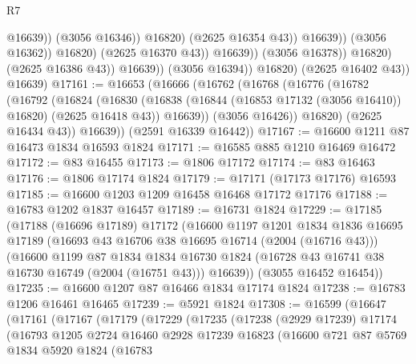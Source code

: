 \begin{lexlean}{R7}
\begin{coremodule}
                                              @16639))
                                          (@3056 @16346))
                                        @16820)
                                      (@2625 @16354 @43))
                                    @16639))
                                (@3056 @16362))
                              @16820)
                            (@2625 @16370 @43))
                          @16639))
                      (@3056 @16378))
                    @16820)
                  (@2625 @16386 @43))
                @16639))
            (@3056 @16394))
          @16820)
        (@2625 @16402 @43))
      @16639)
@17161 := @16653
    (@16666
      (@16762
        (@16768
          (@16776
            (@16782
              (@16792
                (@16824
                  (@16830
                    (@16838 (@16844 (@16853 @17132 (@3056 @16410)) @16820) (@2625 @16418 @43))
                    @16639))
                (@3056 @16426))
              @16820)
            (@2625 @16434 @43))
          @16639))
      (@2591 @16339 @16442))
@17167 := @16600 @1211 @87 @16473 @1834 @16593 @1824
@17171 := @16585 @885 @1210 @16469 @16472
@17172 := @83 @16455
@17173 := @1806 @17172
@17174 := @83 @16463
@17176 := @1806 @17174 @1824
@17179 := @17171 (@17173 @17176) @16593
@17185 := @16600 @1203 @1209 @16458 @16468 @17172 @17176
@17188 := @16783 @1202 @1837 @16457
@17189 := @16731 @1824
@17229 := @17185
    (@17188
      (@16696 @17189)
      @17172
      (@16600
        @1197
        @1201
        @1834
        @1836
        @16695
        @17189
        (@16693 @43 @16706 @38 @16695 @16714 (@2004 (@16716 @43)))
        (@16600
          @1199
          @87
          @1834
          @1834
          @16730
          @1824
          (@16728 @43 @16741 @38 @16730 @16749 (@2004 (@16751 @43)))
          @16639))
      (@3055 @16452 @16454))
@17235 := @16600 @1207 @87 @16466 @1834 @17174 @1824
@17238 := @16783 @1206 @16461 @16465
@17239 := @5921 @1824
@17308 := @16599
    (@16647
      (@17161
        (@17167
          (@17179
            (@17229
              (@17235
                (@17238
                  (@2929 @17239)
                  @17174
                  (@16793
                    @1205
                    @2724
                    @16460
                    @2928
                    @17239
                    @16823
                    (@16600
                      @721
                      @87
                      @5769
                      @1834
                      @5920
                      @1824
                      (@16783

\end{coremodule}
\end{lexlean}
